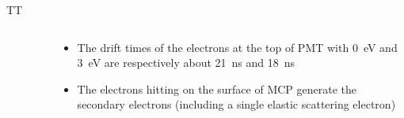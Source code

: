 \documentclass[aspectratio=169]{beamer}
\begin{document}
\begin{frame}{TT}
\begin{columns}
\begin{column}{0.4\textwidth}
\begin{figure}
            \end{figure}
        \end{column}
        \begin{column}{0.6\textwidth}
            \begin{itemize}
                \item The drift times of the electrons at the top of PMT with \SI{0}{eV} and \SI{3}{eV} are respectively about \SI{21}{ns} and \SI{18}{ns}
                \item The electrons hitting on the surface of MCP generate the secondary electrons (including a single elastic scattering electron)
            \end{itemize}
        \end{column}
    \end{columns}
\end{frame}
\end{document}
